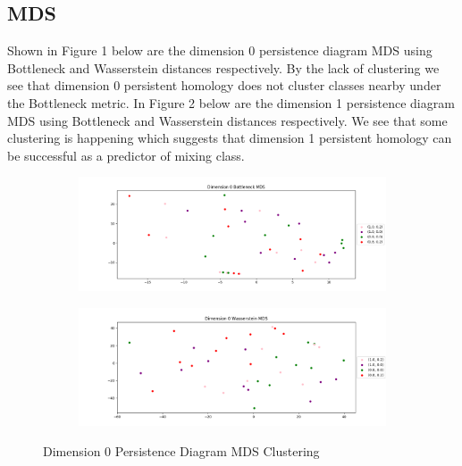 \documentclass[12pt, fullpage,letterpaper]{article}
\theoremstyle{definition}
\begin{document}
	\subsection*{\normalfont MDS} 
	Shown in Figure 1 below are the dimension 0 persistence diagram MDS using Bottleneck and Wasserstein distances respectively. By the lack of clustering we see that dimension 0 persistent homology does not cluster classes nearby under the Bottleneck metric. In Figure 2 below are the dimension 1 persistence diagram MDS using Bottleneck and Wasserstein distances respectively. We see that some clustering is happening which suggests that dimension 1 persistent homology can be successful as a predictor of mixing class.
	\begin{figure}[ht!]
		\centering
		\begin{subfigure}
			\centering
			\includegraphics[scale = .5]{dim0mdsripserbott.png}

		\end{subfigure}
		\begin{subfigure}
			\centering
			\includegraphics[scale = .5]{dim0mdsripserwasser.png}
		\end{subfigure}
		\caption{Dimension 0 Persistence Diagram MDS Clustering}
	\end{figure}
\end{document}
